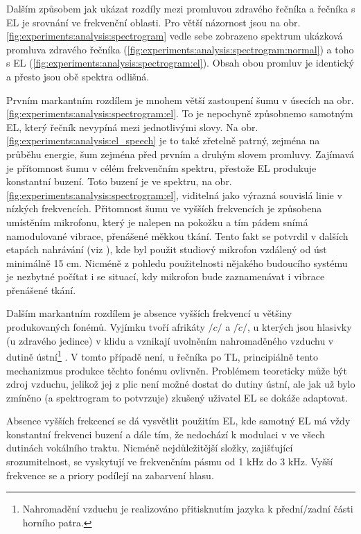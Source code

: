 Dalším způsobem jak ukázat rozdíly mezi promluvou zdravého řečníka a řečníka s EL je srovnání ve frekvenční oblasti. Pro větší názornost jsou na obr. \ref{fig:experiments:analysis:spectrogram} vedle sebe zobrazeno spektrum ukázková promluva zdravého řečníka (\ref{fig:experiments:analysis:spectrogram:normal}) a toho s EL (\ref{fig:experiments:analysis:spectrogram:el}). Obsah obou promluv je identický a přesto jsou obě spektra odlišná.

Prvním markantním rozdílem je mnohem větší zastoupení šumu v úsecích  na obr. \ref{fig:experiments:analysis:spectrogram:el}. To je nepochyně způsobnemo samotným EL, který řečník nevypíná mezi jednotlivými slovy. Na obr. \ref{fig:experiments:analysis:el_speech} je to také zřetelně patrný, zejména na průběhu energie, šum zejména před prvním a druhým slovem promluvy. Zajímavá je přítomnost šumu v célém frekvenčním spektru, přestože EL produkuje konstantní buzení. Toto buzení je ve spektru, na obr. \ref{fig:experiments:analysis:spectrogram:el}, viditelná jako výrazná souvislá linie v nízkých frekvencích. Přitomnost šumu ve vyšších frekvencích je způsobena umístěním mikrofonu, který je nalepen na pokožku a tím pádem snímá namodulované vibrace, přenášené měkkou tkání. Tento fakt se potvrdil v dalších etapách nahrávání (viz ), kde byl použit studiový mikrofon vzdálený od úst minimálně 15 cm. Nicméně z pohledu použitelnosti nějakého budoucího systému je nezbytné počítat i se situací, kdy mikrofon bude zaznamenávat i vibrace přenášené tkání.

Dalším markantním rozdílem je absence vyšších frekvencí u většiny produkovaných fonémů. Vyjímku tvoří afrikáty $/c/$ a $/\check{c}/$, u kterých jsou hlasivky (u zdravého jedince) v klidu a vznikají uvolněním nahromaděného vzduchu v dutině ústní\footnote{Nahromadění vzduchu je realizováno přitisknutím jazyka k přední/zadní části horního patra.} \cite{Psutka2006}. V tomto případě není, u řečníka po TL, principiálně tento mechanizmus produkce těchto fonému ovlivněn. Problémem teoreticky může být zdroj vzduchu, jelikož jej z plic není možné dostat do dutiny ústní, ale jak už bylo zmíněno (a spektrogram to potvrzuje) zkušený uživatel EL se dokáže adaptovat.

Absence vyšších frekcencí se dá vysvětlit použitím EL, kde samotný EL má vždy konstantní frekvenci buzení a dále tím, že nedochází k modulaci v ve všech dutinách vokálního traktu. Nicméně nejdůležitější složky, zajišťující srozumitelnost, se vyskytují ve frekvenčním pásmu od 1 kHz do 3 kHz. Vyšší frekvence se a priory podílejí na zabarvení hlasu.

